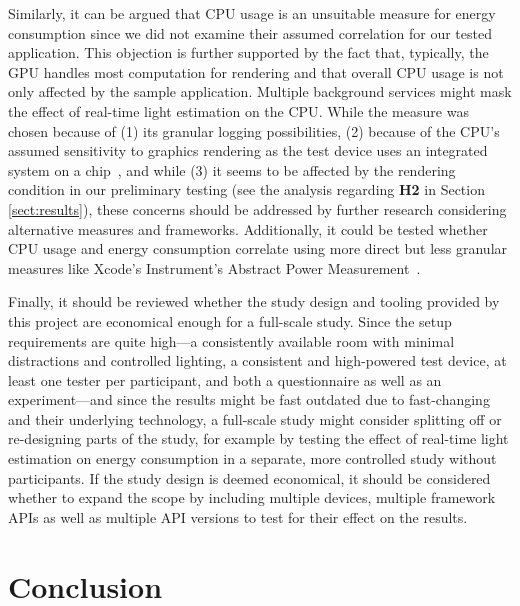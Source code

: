 \documentclass[12pt,twoside,english]{article}
\begin{document}
Similarly, it can be argued that \gls{CPU} usage is an unsuitable measure for energy consumption since we did not examine their assumed correlation for our tested application.
This objection is further supported by the fact that, typically, the \gls{GPU} handles most computation for rendering and that overall \gls{CPU} usage is not only affected by the sample application.
Multiple background services might mask the effect of real-time light estimation on the \gls{CPU}.
While the measure was chosen because of (1) its granular logging possibilities, (2) because of the \gls{CPU}'s assumed sensitivity to graphics rendering as the test device uses an integrated system on a chip~\cite{apple_apple_2017}, and while (3) it seems to be affected by the rendering condition in our preliminary testing (see the analysis regarding \textbf{H2} in Section \ref{sect:results}), these concerns should be addressed by further research considering alternative measures and frameworks.
Additionally, it could be tested whether \gls{CPU} usage and energy consumption correlate using more direct but less granular measures like Xcode's Instrument's Abstract Power Measurement~\cite{apple_abstract_2020}.

Finally, it should be reviewed whether the study design and tooling provided by this project are economical enough for a full-scale study.
Since the setup requirements are quite high---a consistently available room with minimal distractions and controlled lighting, a consistent and high-powered test device, at least one tester per participant, and both a questionnaire as well as an experiment---and since the results might be fast outdated due to fast-changing  and their underlying technology, a full-scale study might consider splitting off or re-designing parts of the study, for example by testing the effect of real-time light estimation on energy consumption in a separate, more controlled study without participants.
If the study design is deemed economical, it should be considered whether to expand the scope by including multiple devices, multiple framework APIs as well as multiple API versions to test for their effect on the results.

\section{Conclusion}
\label{sect:conclusion}
\end{document}
